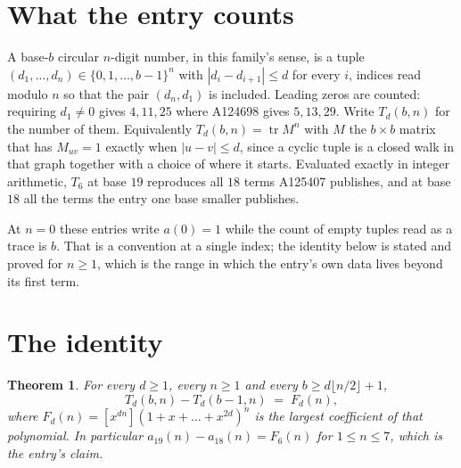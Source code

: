 \documentclass[11pt,a4paper]{article}
\theoremstyle{plain}
\newtheorem{theorem}{Theorem}
\theoremstyle{definition}
\begin{document}
\section{What the entry counts}

A base-$b$ circular $n$-digit number, in this family's sense, is a tuple
$(d_1,\dots,d_n)\in\{0,1,\dots,b-1\}^{n}$ with $|d_i-d_{i+1}|\le d$ for every $i$, indices
read modulo $n$ so that the pair $(d_n,d_1)$ is included. Leading zeros are counted: requiring
$d_1\ne0$ gives $4,11,25$ where A124698 gives $5,13,29$. Write $T_d(b,n)$ for the number of
them. Equivalently $T_d(b,n)=\operatorname{tr}M^{n}$ with $M$ the $b\times b$ matrix that has
$M_{uv}=1$ exactly when $|u-v|\le d$, since a cyclic tuple is a closed walk in that graph
together with a choice of where it starts. Evaluated exactly in integer arithmetic, $T_{6}$
at base $19$ reproduces all $18$ terms A125407 publishes, and at base $18$ all the
terms the entry one base smaller publishes.

At $n=0$ these entries write $a(0)=1$ while the count of empty tuples read as a trace is $b$.
That is a convention at a single index; the identity below is stated and proved for $n\ge1$,
which is the range in which the entry's own data lives beyond its first term.

\section{The identity}

\begin{theorem}
For every $d\ge1$, every $n\ge1$ and every $b\ge d\lfloor n/2\rfloor+1$,
\[
T_d(b,n)-T_d(b-1,n)\;=\;F_d(n),
\]
where $F_d(n)=[x^{dn}](1+x+\dots+x^{2d})^{n}$ is the largest coefficient of that
polynomial. In particular $a_{19}(n)-a_{18}(n)=F_{6}(n)$ for $1\le n\le7$, which
is the entry's claim.
\end{theorem}
\end{document}
